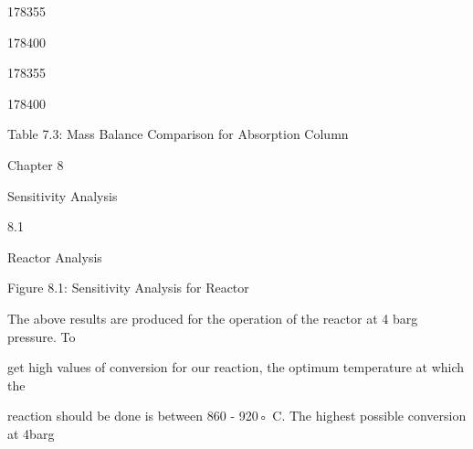 \documentclass[a4paper,portrait,12pt]{article}
\begin{document}
178355





178400





178355





178400





\begin{flushleft}
Table 7.3: Mass Balance Comparison for Absorption Column
\end{flushleft}





\begin{flushleft}
\newpage
Chapter 8
\end{flushleft}





\begin{flushleft}
Sensitivity Analysis
\end{flushleft}


8.1





\begin{flushleft}
Reactor Analysis
\end{flushleft}





\begin{flushleft}
Figure 8.1: Sensitivity Analysis for Reactor
\end{flushleft}





\begin{flushleft}
The above results are produced for the operation of the reactor at 4 barg pressure. To
\end{flushleft}


\begin{flushleft}
get high values of conversion for our reaction, the optimum temperature at which the
\end{flushleft}


\begin{flushleft}
reaction should be done is between 860 - 920◦ C. The highest possible conversion at 4barg
\end{flushleft}
\end{document}
